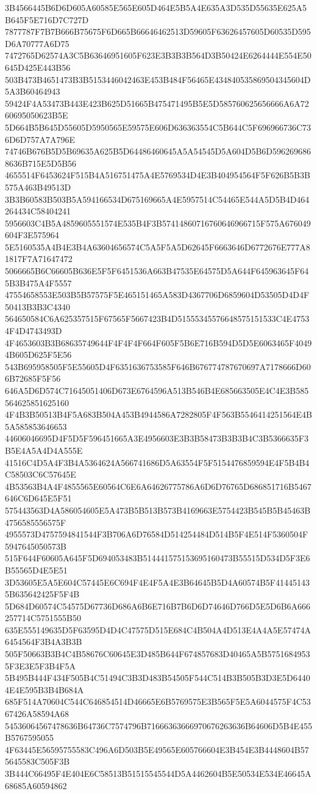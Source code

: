 {{{{{{{{{{{{{{{{{{{{{3B4566445B6D6D605A60585E565E605D464E5B5A4E635A3D535D55635E625A5B645F5E716D7C727D
7877787F7B7B666B75675F6D665B66646462513D59605F63626457605D60535D595D6A70777A6D75
7472765D62574A3C5B63646951605F623E3B3B3B564D3B50424E6264444E554E50645D425E443B56
503B473B4651473B3B5153446042463E453B484F56465E434840535869504345604D5A3B60464943
59424F4A53473B443E423B625D51665B475471495B5E5D585760625656666A6A7260695050623B5E
5D664B5B645D55605D5950565E59575E606D636363554C5B644C5F696966736C736D6D757A7A796E
74746B676B5D5B69635A625B5D64486460645A5A54545D5A604D5B6D5962696868636B715E5D5B56
4655514F6453624F515B4A516751475A4E5769534D4E3B404954564F5F626B5B3B575A463B49513D
3B3B60583B503B5A594166534D675169665A4E5957514C54465E544A5D5B4D464264434C58404241
5956603C4B5A4859605551574E535B4F3B57414860716760646966715F575A676049604F3E575964
5E5160535A4B4E3B4A63604656574C5A5F5A5D62645F6663646D6772676E777A81817F7A71647472
5066665B6C66605B636E5F5F6451536A663B47535E64575D5A644F645963645F645B3B475A4F5557
47554658553E503B5B57575F5E465151465A583D4367706D6859604D53505D4D4F50413B3B3C4340
564650584C6A625357515F67565F5667423B4D51555345576648575151533C4E47534F4D4743493D
4F4653603B3B68635749644F4F4F4F664F605F5B6E716B594D5D5E6063465F40494B605D625F5E56
543B695958505F5E55605D4F6351636753585F646B676774787670697A7178666D606B72685F5F56
646A5D6D574C71645051406D673E6764596A513B546B4E685663505E4C4E3B585564625851625160
4F4B3B50513B4F5A683B504A453B4944586A7282805F4F563B5546414251564E4B5A585853646653
44606046695D4F5D5F596451665A3E4956603E3B3B58473B3B3B4C3B5366635F3B5E4A5A4D4A555E
41516C4D5A4F3B4A5364624A566741686D5A63554F5F5154476859594E4F5B4B4C58503C6C57645E
4B53563B4A4F4855565E60564C6E6A64626775786A6D6D76765D686851716B5467646C6D645E5F51
575443563D4A586054605E5A473B5B513B573B4169663E5754423B545B5B45463B4756585556575F
4955573D4757594841544F3B706A6D76584D514254484D514B5F4E514F5360504F5947645050573B
515F644F60605A645F5D694053483B514441575153695160473B55515D534D5F3E6B55565D4E5E51
3D53605E5A5E604C57445E6C694F4E4F5A4E3B64645B5D4A60574B5F414451435B635642425F5F4B
5D684D60574C54575D67736D686A6B6E716B7B6D6D74646D766D5E5D6B6A666257714C5751555B50
635E555149635D5F63595D4D4C47575D515E684C4B504A4D513E4A4A5E57474A6454564F3B4A3B3B
505F50663B3B4C4B58676C60645E3D485B644F674857683D40465A5B57516849535F3E3E5F3B4F5A
5B495B444F434F505B4C51494C3B3D483B54505F544C514B3B505B3D3E5D64404E4E595B3B4B684A
685F514A70604C544C646854514D46665E6B5769575E3B565F5E5A6044575F4C5367426A58594A68
54536064567478636B64736C7574796B71666363666970676263636B64606D5B4E455B5767595055
4F63445E56595755583C496A6D503B5E49565E605766604E3B454E3B4448604B575645583C505F3B
3B444C66495F4E404E6C58513B51515545544D5A4462604B5E50534E534E46645A68685A60594862
}}}}}}}}}}}}}}}}}}}}}
